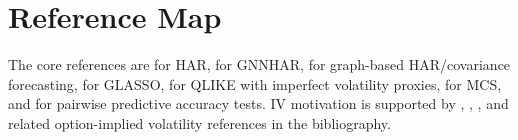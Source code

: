 \documentclass[11pt,a4paper]{article}
\begin{document}
\section{Reference Map}
\label{app:reference-map}

The core references are \citet{corsi2009har} for HAR, \citet{zhang2025gnnhar} for GNNHAR, \citet{zhang2024graphcovariance} for graph-based HAR/covariance forecasting, \citet{friedman2008glasso} for GLASSO, \citet{patton2011volatility} for QLIKE with imperfect volatility proxies, \citet{hansen2011mcs} for MCS, and \citet{diebold1995dm} for pairwise predictive accuracy tests.  IV motivation is supported by \citet{busch2011iv}, \citet{kambouroudis2021hariv}, \citet{yfanti2021aimheavy}, and related option-implied volatility references in the bibliography.



\end{document}
